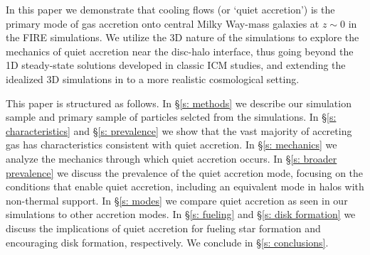 \documentclass[fleqn,usenatbib]{mnras}
\begin{document}
In this paper we demonstrate that cooling flows (or `quiet accretion') is the primary mode of gas accretion onto central Milky Way-mass galaxies at $z \sim 0$ in the FIRE simulations. 
We utilize the 3D nature of the simulations to explore the mechanics of quiet accretion near the disc-halo interface, thus going beyond the 1D steady-state solutions developed in classic ICM studies, and extending the idealized 3D simulations in \cite{Stern2020} to a more realistic cosmological setting. 

This paper is structured as follows. 
In \S\ref{s: methods} we describe our simulation sample and primary sample of particles selcted from the simulations.
In \S\ref{s: characteristics} and \S\ref{s: prevalence} we show that the vast majority of accreting gas has characteristics consistent with quiet accretion.
In \S\ref{s: mechanics} we analyze the mechanics through which quiet accretion occurs.
In \S\ref{s: broader prevalence} we discuss the prevalence of the quiet accretion mode, focusing on the conditions that enable quiet accretion, including an equivalent mode in halos with non-thermal support.
In \S\ref{s: modes} we compare quiet accretion as seen in our simulations to other accretion modes.
In \S\ref{s: fueling} and \S\ref{s: disk formation} we discuss the implications of quiet accretion for fueling star formation and encouraging disk formation, respectively.
We conclude in \S\ref{s: conclusions}.

\end{document}

